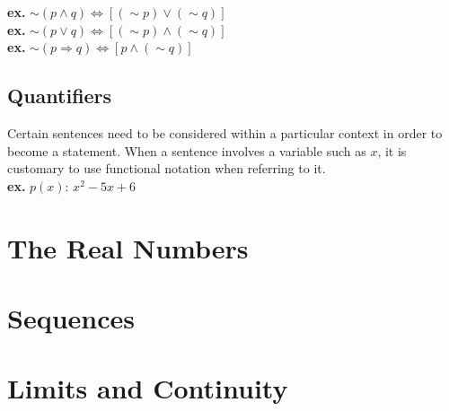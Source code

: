 \documentclass[11pt]{article}
\begin{document}
\indent \indent \indent \textbf{ex. } $\sim(p\land q) \Leftrightarrow [(\sim p)\lor (\sim q)] $ \\
\indent \indent \indent \textbf{ex. } $ \sim (p \lor q) \Leftrightarrow [(\sim p) \land ( \sim q)]$ \\
\indent \indent \indent \textbf{ex. } $ \sim (p \Rightarrow q) \Leftrightarrow [ p \land ( \sim q)]$
\pagebreak


\subsection{Quantifiers}
Certain sentences need to be considered within a particular context in order to become a statement. When a sentence involves a variable such as $x$, it is customary to use functional notation when referring to it. \\ 

\textbf{ex.} $p(x)$: $x^2 - 5x + 6$


\pagebreak
\section{The Real Numbers}
\section{Sequences}
\section{Limits and Continuity}
\end{document}
